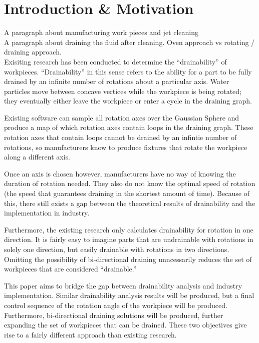 							\chapter{Introduction \& Motivation}

A paragraph about manufacturing work pieces and jet cleaning
\\

A paragraph about draining the fluid after cleaning. Oven approach vs rotating / draining approach.
\\

Exisiting research \cite{plot} has been conducted to determine the ``drainability'' of workpieces. ``Drainability'' in this sense refers to the ability for a part to be fully drained by an infinite number of rotations about a particular axis. Water particles move between concave vertices while the workpiece is being rotated; they eventually either leave the workpiece or enter a cycle in the draining graph.

Existing software can sample all rotation axes over the Gaussian Sphere and produce a map of which rotation axes contain loops in the draining graph. These rotation axes that contain loops cannot be drained by an infintie number of rotations, so manufacturers know to produce fixtures that rotate the workpiece along a different axis.

Once an axis is chosen however, manufacturers have no way of knowing the duration of rotation needed. They also do not know the optimal speed of rotation (the speed that guarantees draining in the shortest amount of time). Because of this, there still exists a gap between the theoretical results of drainability and the implementation in industry.

Furthermore, the existing research only calculates drainability for rotation in one direction. It is fairly easy to imagine parts that are undrainable with rotations in solely one direction, but easily drainable with rotations in two directions. Omitting the possibility of bi-directional draining unncessarily reduces the set of workpieces that are considered ``drainable.''

This paper aims to bridge the gap between drainability analysis and industry implementation. Similar drainability analysis results will be produced, but a final control sequence of the rotation angle of the workpiece will be produced. Furthermore, bi-directional draining solutions will be produced, further expanding the set of workpieces that can be drained. These two objectives give rise to a fairly different approach than existing research.

